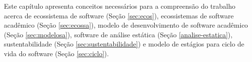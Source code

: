 \label{fundamentacao}

Este capítulo apresenta conceitos necessários para a compreensão do trabalho
acerca de ecossistema de software (Seção \ref{sec:ecos}),
ecossistemas de software acadêmico (Seção \ref{sec:ecossa}),
modelo de desenvolvimento de software acadêmico (Seção \ref{sec:modelosa}),
software de análise estática (Seção \ref{analise-estatica}),
sustentabilidade (Seção \ref{sec:sustentabilidade}) e modelo de estágios
para ciclo de vida do software (Seção \ref{sec:ciclo}).






